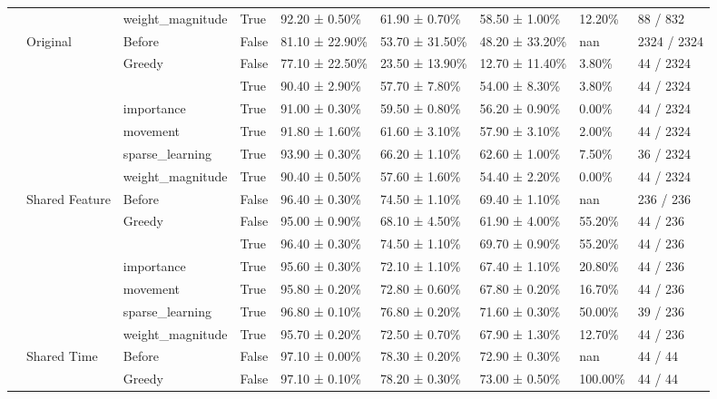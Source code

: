 \begin{tabular}{lllllllll}
\cline{3-9}
 &  & weight\_magnitude & True & 92.20 ± 0.50\% & 61.90 ± 0.70\% & 58.50 ± 1.00\% & 12.20\% & 88 / 832 \\
\cline{2-9} \cline{3-9}
 & \multirow[t]{7}{*}{Original} & Before & False & 81.10 ± 22.90\% & 53.70 ± 31.50\% & 48.20 ± 33.20\% & nan & 2324 / 2324 \\
\cline{3-9}
 &  & \multirow[t]{2}{*}{Greedy} & False & 77.10 ± 22.50\% & 23.50 ± 13.90\% & 12.70 ± 11.40\% & 3.80\% & 44 / 2324 \\
 &  &  & True & 90.40 ± 2.90\% & 57.70 ± 7.80\% & 54.00 ± 8.30\% & 3.80\% & 44 / 2324 \\
\cline{3-9}
 &  & importance & True & 91.00 ± 0.30\% & 59.50 ± 0.80\% & 56.20 ± 0.90\% & 0.00\% & 44 / 2324 \\
\cline{3-9}
 &  & movement & True & 91.80 ± 1.60\% & 61.60 ± 3.10\% & 57.90 ± 3.10\% & 2.00\% & 44 / 2324 \\
\cline{3-9}
 &  & sparse\_learning & True & 93.90 ± 0.30\% & 66.20 ± 1.10\% & 62.60 ± 1.00\% & 7.50\% & 36 / 2324 \\
\cline{3-9}
 &  & weight\_magnitude & True & 90.40 ± 0.50\% & 57.60 ± 1.60\% & 54.40 ± 2.20\% & 0.00\% & 44 / 2324 \\
\cline{2-9} \cline{3-9}
 & \multirow[t]{7}{*}{Shared Feature} & Before & False & 96.40 ± 0.30\% & 74.50 ± 1.10\% & 69.40 ± 1.10\% & nan & 236 / 236 \\
\cline{3-9}
 &  & \multirow[t]{2}{*}{Greedy} & False & 95.00 ± 0.90\% & 68.10 ± 4.50\% & 61.90 ± 4.00\% & 55.20\% & 44 / 236 \\
 &  &  & True & 96.40 ± 0.30\% & 74.50 ± 1.10\% & 69.70 ± 0.90\% & 55.20\% & 44 / 236 \\
\cline{3-9}
 &  & importance & True & 95.60 ± 0.30\% & 72.10 ± 1.10\% & 67.40 ± 1.10\% & 20.80\% & 44 / 236 \\
\cline{3-9}
 &  & movement & True & 95.80 ± 0.20\% & 72.80 ± 0.60\% & 67.80 ± 0.20\% & 16.70\% & 44 / 236 \\
\cline{3-9}
 &  & sparse\_learning & True & 96.80 ± 0.10\% & 76.80 ± 0.20\% & 71.60 ± 0.30\% & 50.00\% & 39 / 236 \\
\cline{3-9}
 &  & weight\_magnitude & True & 95.70 ± 0.20\% & 72.50 ± 0.70\% & 67.90 ± 1.30\% & 12.70\% & 44 / 236 \\
\cline{2-9} \cline{3-9}
 & \multirow[t]{7}{*}{Shared Time} & Before & False & 97.10 ± 0.00\% & 78.30 ± 0.20\% & 72.90 ± 0.30\% & nan & 44 / 44 \\
\cline{3-9}
 &  & \multirow[t]{2}{*}{Greedy} & False & 97.10 ± 0.10\% & 78.20 ± 0.30\% & 73.00 ± 0.50\% & 100.00\% & 44 / 44 \\

\end{tabular}
